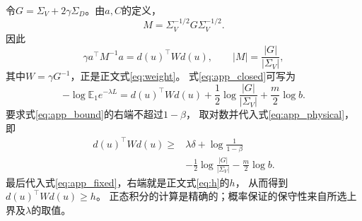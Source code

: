 \documentclass[journal,10pt]{IEEEtran}
\newcommand{\E}{\mathbb E}
\begin{document}
令$G=\Sigma_V+2\gamma\Sigma_D$。由$a,C$的定义，
\[
M=\Sigma_V^{-1/2}G\Sigma_V^{-1/2}.
\]
因此
\[
\gamma a^\top M^{-1}a=d(u)^\top Wd(u),
\qquad |M|=\frac{|G|}{|\Sigma_V|},
\]
其中$W=\gamma G^{-1}$，正是正文式\eqref{eq:weight}。
式\eqref{eq:app_closed}可写为
\begin{equation}
-\log\E_1e^{-\lambda L}
=d(u)^\top Wd(u)
+\frac12\log\frac{|G|}{|\Sigma_V|}
+\frac m2\log b. \label{eq:app_physical}
\end{equation}
要求式\eqref{eq:app_bound}的右端不超过$1-\beta$，
取对数并代入式\eqref{eq:app_physical}，即
\begin{equation}
\begin{split}
d(u)^\top Wd(u)\ge{}&
\lambda\delta+\log\frac1{1-\beta}\\
&-\frac12\log\frac{|G|}{|\Sigma_V|}-\frac m2\log b.
\end{split} \label{eq:app_final}
\end{equation}
最后代入式\eqref{eq:app_fixed}，右端就是正文式\eqref{eq:h}的$h$，
从而得到$d(u)^\top Wd(u)\ge h$。
正态积分的计算是精确的；概率保证的保守性来自所选上界及$\lambda$的取值。
\end{document}
